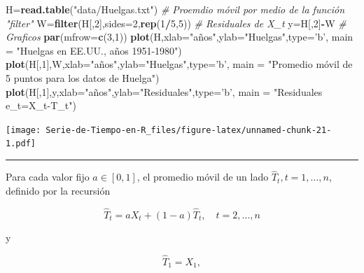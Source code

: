 \documentclass[12pt,]{krantz}
\makeatletter
\newenvironment{Shaded}{\begin{snugshade}}{\end{snugshade}}
\newcommand{\KeywordTok}[1]{\textcolor[rgb]{0.13,0.29,0.53}{\textbf{#1}}}
\newcommand{\DataTypeTok}[1]{\textcolor[rgb]{0.13,0.29,0.53}{#1}}
\newcommand{\DecValTok}[1]{\textcolor[rgb]{0.00,0.00,0.81}{#1}}
\newcommand{\StringTok}[1]{\textcolor[rgb]{0.31,0.60,0.02}{#1}}
\newcommand{\CommentTok}[1]{\textcolor[rgb]{0.56,0.35,0.01}{\textit{#1}}}
\newcommand{\OperatorTok}[1]{\textcolor[rgb]{0.81,0.36,0.00}{\textbf{#1}}}
\newcommand{\NormalTok}[1]{#1}
\newenvironment{kframe}{%
\medskip{}
\setlength{\fboxsep}{.8em}
 \def\at@end@of@kframe{}%
 \ifinner\ifhmode%
  \def\at@end@of@kframe{\end{minipage}}%
  \begin{minipage}{\columnwidth}%
 \fi\fi%
 \def\FrameCommand##1{\hskip\@totalleftmargin \hskip-\fboxsep
 \colorbox{shadecolor}{##1}\hskip-\fboxsep
     \hskip-\linewidth \hskip-\@totalleftmargin \hskip\columnwidth}%
 \MakeFramed {\advance\hsize-\width
   \@totalleftmargin\z@ \linewidth\hsize
   \@setminipage}}%
 {\par\unskip\endMakeFramed%
 \at@end@of@kframe}
\renewenvironment{Shaded}{\begin{kframe}}{\end{kframe}}
\theoremstyle{definition}
\theoremstyle{definition}
\theoremstyle{definition}
\theoremstyle{remark}
\makeatother
\begin{document}
\begin{Shaded}
\begin{Highlighting}[]
\NormalTok{H=}\KeywordTok{read.table}\NormalTok{(}\StringTok{"data/Huelgas.txt"}\NormalTok{)}
\CommentTok{# Proemdio móvil por medio de la función "filter"}
\NormalTok{W=}\KeywordTok{filter}\NormalTok{(H[,}\DecValTok{2}\NormalTok{],}\DataTypeTok{sides=}\DecValTok{2}\NormalTok{,}\KeywordTok{rep}\NormalTok{(}\DecValTok{1}\OperatorTok{/}\DecValTok{5}\NormalTok{,}\DecValTok{5}\NormalTok{))}
\CommentTok{# Residuales de X_t}
\NormalTok{y=H[,}\DecValTok{2}\NormalTok{]}\OperatorTok{-}\NormalTok{W }
\CommentTok{# Graficos}
\KeywordTok{par}\NormalTok{(}\DataTypeTok{mfrow=}\KeywordTok{c}\NormalTok{(}\DecValTok{3}\NormalTok{,}\DecValTok{1}\NormalTok{))}
\KeywordTok{plot}\NormalTok{(H,}\DataTypeTok{xlab=}\StringTok{"años"}\NormalTok{,}\DataTypeTok{ylab=}\StringTok{"Huelgas"}\NormalTok{,}\DataTypeTok{type=}\StringTok{'b'}\NormalTok{,}
     \DataTypeTok{main =} \StringTok{"Huelgas en EE.UU., años 1951-1980"}\NormalTok{)}
\KeywordTok{plot}\NormalTok{(H[,}\DecValTok{1}\NormalTok{],W,}\DataTypeTok{xlab=}\StringTok{"años"}\NormalTok{,}\DataTypeTok{ylab=}\StringTok{"Huelgas"}\NormalTok{,}\DataTypeTok{type=}\StringTok{'b'}\NormalTok{,}
     \DataTypeTok{main =} \StringTok{"Promedio móvil de 5 puntos para los datos de Huelga"}\NormalTok{)}
\KeywordTok{plot}\NormalTok{(H[,}\DecValTok{1}\NormalTok{],y,}\DataTypeTok{xlab=}\StringTok{"años"}\NormalTok{,}\DataTypeTok{ylab=}\StringTok{"Residuales"}\NormalTok{,}\DataTypeTok{type=}\StringTok{'b'}\NormalTok{,}
     \DataTypeTok{main =} \StringTok{"Residuales e_t=X_t-T_t"}\NormalTok{)}
\end{Highlighting}
\end{Shaded}

\texttt{[image: Serie-de-Tiempo-en-R\_files/figure-latex/unnamed-chunk-21-1.pdf]}

\begin{center}\rule{0.5\linewidth}{\linethickness}\end{center}

Para cada valor fijo \(a\in[0,1]\), el promedio móvil de un lado
\(\hat{T}_t, t=1,\ldots,n\), definido por la recursión

\begin{equation}
  \hat{T}_t = aX_t+(1-a)\hat{T}_t,\quad t=2,\ldots,n
 \label{eq:eq-promedio-movil-1-lado-peso}
\end{equation}

y

\[\hat{T}_1=X_1,\]
\end{document}
